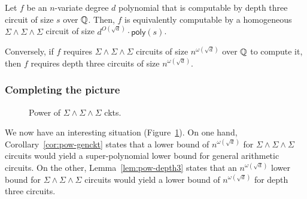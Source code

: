 \documentclass{beatcs}
\newcommand{\poly}{\mathsf{poly}}
\newcommand{\SPS}{\Sigma\Pi\Sigma}
\newcommand{\SESES}{\Sigma\!\wedge\!\Sigma\!\wedge\!\Sigma}
\begin{document}
\begin{lemma}\label{lem:pow-depth3}
Let $f$ be an $n$-variate degree $d$ polynomial that is computable by depth three circuit of size $s$ over $\mathbb{Q}$. Then, $f$ is equivalently computable by a homogeneous $\Sigma\!\wedge\!\Sigma\!\wedge\!\Sigma$ circuit of size $d^{O(\sqrt{d})}\cdot \poly(s)$. 

Conversely, if $f$ requires $\Sigma\!\wedge\!\Sigma\!\wedge\!\Sigma$ circuits of size $n^{\omega(\sqrt{d})}$ over $\mathbb{Q}$ to compute it, then $f$ requires depth three circuits of size $n^{\omega(\sqrt{d})}$. 
\end{lemma}

\subsubsection{Completing the picture}

\begin{figure}
\begin{center}
\end{center}
\caption{Power of $\SESES$ ckts.}
\label{fig:SESES}
\end{figure}


We now have an interesting situation (Figure~\ref{fig:SESES}). On one hand, Corollary~\ref{cor:pow-genckt} states that a lower bound of $n^{\omega(\sqrt{d})}$ for $\SESES$ circuits would yield a super-polynomial lower bound for general arithmetic circuits. On the other, Lemma~\ref{lem:pow-depth3} states that an $n^{\omega(\sqrt{d})}$ lower bound for $\SESES$ circuits would yield a lower bound of $n^{\omega(\sqrt{d})}$ for depth three circuits. 
\end{document}
